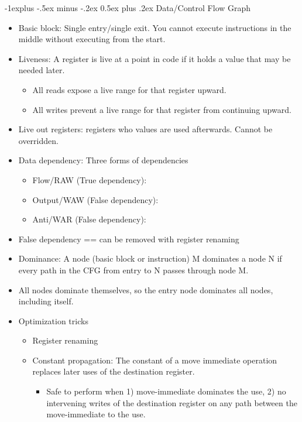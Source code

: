\documentclass[8pt, landscape]{extarticle}
\makeatletter
\renewcommand{\subsection}{\@startsection{subsection}{2}{0mm}%
  {-1explus -.5ex minus -.2ex}%
  {0.5ex plus .2ex}%
{\normalfont\normalsize\bfseries}}
\makeatother
\begin{document}
\begin{multicols*}{4}
  \subsection{Data/Control Flow Graph}
  \begin{itemize}
    \item Basic block: Single entry/single exit. You cannot execute instructions in the middle without executing from the start.
    \item Liveness: A register is live at a point in code if it holds a value that may be needed later.
    \begin{itemize}
      \item All reads expose a live range for that register upward.
      \item All writes prevent a live range for that register from continuing upward.
    \end{itemize}
    \item Live out registers: registers who values are used afterwards. Cannot be overridden.
    \item Data dependency: Three forms of dependencies
    \begin{itemize}
      \item Flow/RAW (True dependency):
      \item Output/WAW (False dependency):
      \item Anti/WAR (False dependency):
    \end{itemize}
    \item False dependency == can be removed with register renaming
    \item Dominance: A node (basic block or instruction) M dominates a node N if every path in the CFG from entry to N passes through node M.
    \item All nodes dominate themselves, so the entry node dominates all nodes, including itself.
    \item Optimization tricks
    \begin{itemize}
      \item Register renaming
      \item Constant propagation: The constant of a move immediate operation replaces later uses of the destination register.
      \begin{itemize}
        \item Safe to perform when 1) move-immediate dominates the use, 2) no intervening writes of the destination register on any path between the move-immediate to the use.
      \end{itemize}

\end{itemize}
\end{itemize}
\end{multicols*}
\end{document}
